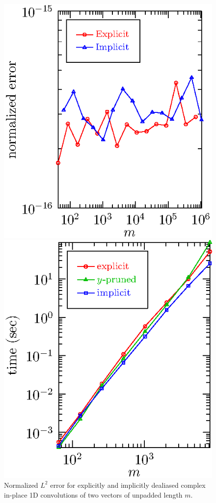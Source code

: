 \documentclass[final]{siamltex}
\begin{document}
\begin{figure}[htbp]
\begin{minipage}{0.5\linewidth}
\begin{center}
\includegraphics{error1r}
\caption{Normalized $L^2$ error for explicitly and implicitly
dealiased complex in-place 1D convolutions of two vectors of
unpadded length $m$.}
\label{error1r}
\end{center}
\end{minipage}
%
\begin{minipage}{0.5\linewidth}
\begin{center}
\includegraphics{timing2c}

\end{center}
\end{minipage}
\end{figure}
\end{document}
